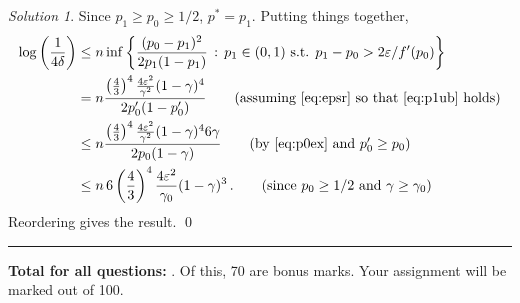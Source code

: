 \documentclass{article}
\DeclareMathOperator*{\1}{\mathbbm{1}}
\newcommand{\0}{\mathbf{0}}
\newcounter{DocPoints} %
\theoremstyle{definition}
\newtheorem{question}{Question}
\theoremstyle{remark}
\newtheorem*{solution*}{Solution}
\theoremstyle{theorem}
\begin{document}
\begin{solution*}
Since $p_1\ge p_0 \ge 1/2$, $p^* = p_1$. Putting things together,
\begin{align*}
\log\left(\frac{1}{4\delta}\right) 
& 
\le
n \inf \left\{ \frac{(p_0-p_1)^2}{2 p_1(1-p_1)} \,:\, p_1\in (0,1)
\text{ s.t. } p_1-p_0>2\varepsilon/f'(p_0)
\right\} \\
& = 
n \frac{\left(\frac43\right)^4 \frac{4 \varepsilon^2 }{\gamma^2}(1-\gamma)^4}{2 p_0'(1-p_0')}
\tag{assuming \cref{eq:epsr} so that \cref{eq:p1ub} holds}\\
& \le
n \frac{\left(\frac43\right)^4 \frac{4 \varepsilon^2 }{\gamma^2}(1-\gamma)^4 6\gamma}{2 p_0(1-\gamma)} 
\tag{by \cref{eq:p0ex} and $p_0'\ge p_0$}\\
& \le
n \,6\left(\frac43\right)^4 \frac{4 \varepsilon^2 }{\gamma_0}(1-\gamma)^3 \,.
\tag{since $p_0\ge 1/2$ and $\gamma\ge \gamma_0$}
\end{align*}
Reordering gives the result.
\qed\par\smallskip\hrule
\end{solution*}




\bigskip
\bigskip

\noindent
\textbf{
Total for all questions: }.
Of this, 70 are bonus marks. 
Your assignment will be marked out of 100.
\end{document}
